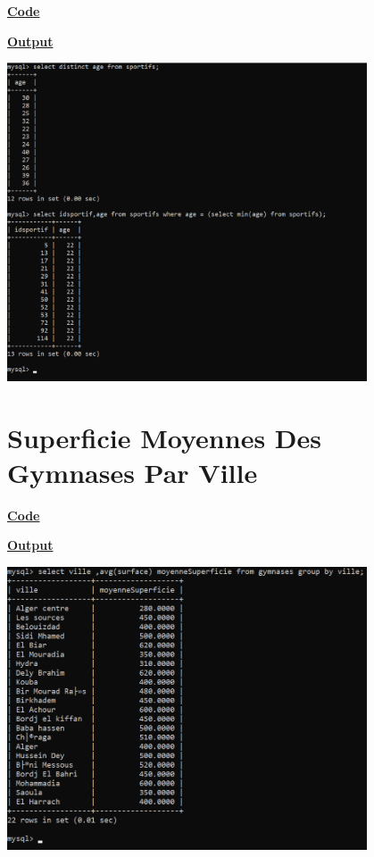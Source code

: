 \textbf{\underline{Code}}


\vspace{0.5cm}
\textbf{\underline{Output}}

\vspace{0.25cm}
\begin{center}
    \includegraphics[width=0.8\textwidth]{Parties/Partie3/age.PNG}
\end{center}

\newpage

\section{Superficie Moyennes Des Gymnases Par Ville}

\textbf{\underline{Code}}


\vspace{0.5cm}
\textbf{\underline{Output}}

\vspace{0.25cm}
\begin{center}
    \includegraphics[width=0.8\textwidth]{Parties/Partie3/avg.PNG}
\end{center}

